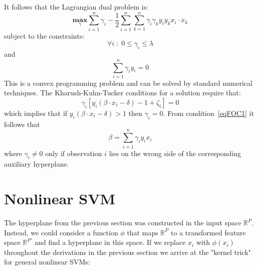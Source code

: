 \documentclass[11pt]{article}
\begin{document}
It follows that the Lagrangian dual problem is:
\begin{equation} \label{eq1}
\underset{\gamma}{\mathbf{max}} \sum_{i=1}^n \gamma_i - \frac{1}{2} \sum_{i=1}^n \sum_{k=1}^n \gamma_i \gamma_k y_i y_k x_i \cdot x_k
\end{equation}
subject to the constraints:
\begin{equation} \label{eq1}
\forall i \; : \; 0 \leq \gamma_i \leq \lambda
\end{equation}
and
\begin{equation} \label{eq1}
\sum_{i=1}^n \gamma_i y_i = 0
\end{equation}
This is a convex programming problem and can be solved by standard numerical techniques.
The Kharush-Kuhn-Tucker conditions for a solution require that:
\begin{equation} \label{eq1}
\gamma_i \left[ y_i \left( \beta \cdot x_i - \delta \right) - 1 + \zeta_i \right] = 0
\end{equation}
which implies that if $y_i \left( \beta \cdot x_i - \delta \right) > 1$ then $\gamma_i = 0$.
From condition~\eqref{eqFOC1} it follows that
\begin{equation} \label{eq1}
\beta = \sum_{i=1}^n \gamma_i y_i x_i
\end{equation}
where $\gamma_i \neq 0$ only if observation $i$ lies on the wrong side of the corresponding auxiliary hyperplane.
\section{Nonlinear SVM}
The hyperplane from the previous section was constructed in the input space $\mathbb{R}^P$. Instead, we could consider a function $\phi$ that maps $\mathbb{R}^P$ to a transformed feature space $\mathbb{R}^{P'}$ and find a hyperplane in this space. If we replace $x_i$ with $\phi \left( x_i \right)$ throughout the derivations in the previous section we arrive at the "kernel trick" for general nonlinear SVMs:
\end{document}

